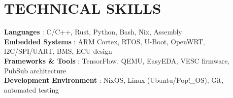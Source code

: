 \section{TECHNICAL SKILLS}
\begin{itemize}[leftmargin=0in, label={}]
    \small{\item{
                    \textbf{Languages} {: C/C++, Rust, Python, Bash, Nix, Assembly}\vspace{1pt} \\
                    \textbf{Embedded Systems} {: ARM Cortex, RTOS, U-Boot, OpenWRT, I2C/SPI/UART, BMS, ECU design}\vspace{1pt} \\
                    \textbf{Frameworks \& Tools} {: TensorFlow, QEMU, EasyEDA, VESC firmware, PubSub architecture}\vspace{1pt} \\
                    \textbf{Development Environment} {: NixOS, Linux (Ubuntu/Pop!\_OS), Git, automated testing}\vspace{1pt}
              }}
\end{itemize}

